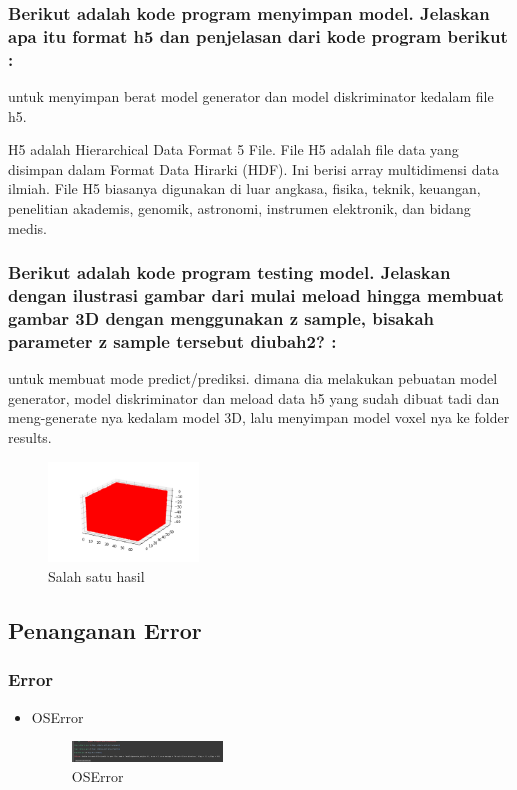 \subsubsection{Berikut adalah kode program menyimpan model. Jelaskan apa itu format h5 dan penjelasan dari kode program berikut :}
\hfill\break

untuk menyimpan berat model generator dan model diskriminator kedalam file h5.

H5 adalah Hierarchical Data Format 5 File.
File H5 adalah file data yang disimpan dalam Format Data Hirarki (HDF). Ini berisi array multidimensi data ilmiah. File H5 biasanya digunakan di luar angkasa, fisika, teknik, keuangan, penelitian akademis, genomik, astronomi, instrumen elektronik, dan bidang medis.


\subsubsection{Berikut adalah kode program testing model. Jelaskan dengan ilustrasi gambar dari mulai meload hingga membuat gambar 3D dengan menggunakan z sample, bisakah parameter z sample tersebut diubah2? :}
\hfill\break

untuk membuat mode predict/prediksi. dimana dia melakukan pebuatan model generator, model diskriminator dan meload data h5 yang sudah dibuat tadi dan meng-generate nya kedalam model 3D, lalu menyimpan model voxel nya ke folder results.
\begin{figure}[H]
\centering
	\includegraphics[width=4cm]{figures/1174067/8/img_0_0_0.png}
\caption{Salah satu hasil}
\end{figure}


\subsection{Penanganan Error}
\subsubsection{Error}
\hfill\break
\begin{itemize}
\item OSError

\begin{figure}[H]
\centering
	\includegraphics[width=4cm]{figures/1174067/8/error1.jpg}
\caption{OSError}
\end{figure}
\end{itemize}
